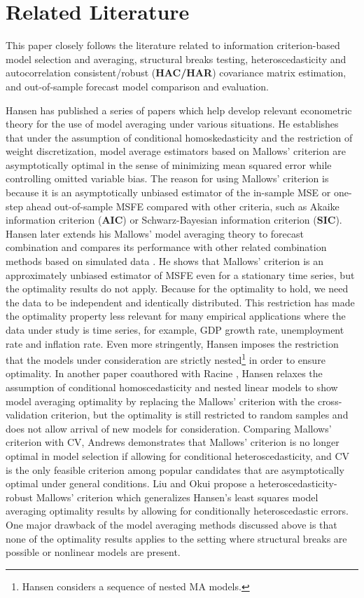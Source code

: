 \section{Related Literature}
This paper closely follows the literature related to information criterion-based model selection and averaging, structural breaks testing, heteroscedasticity and autocorrelation consistent/robust (\textbf{HAC/HAR}) covariance matrix estimation, and out-of-sample forecast model comparison and evaluation.

Hansen has published a series of papers \cite{hansen_EMETRICA2007} \cite{hansen_JE2008} \cite{hansen2009averaging} \cite{hansen2011jackknife} which help develop relevant econometric theory for the use of model averaging under various situations. He establishes that under the assumption of conditional homoskedasticity and the restriction of weight discretization, model average estimators based on Mallows' criterion are asymptotically optimal in the sense of minimizing mean squared error while controlling omitted variable bias. The reason for using Mallows' criterion is because it is an asymptotically unbiased estimator of the in-sample MSE or one-step ahead out-of-sample MSFE compared with other criteria, such as Akaike information criterion (\textbf{AIC}) or Schwarz-Bayesian information criterion (\textbf{SIC}). Hansen later extends his Mallows' model averaging theory to forecast combination and compares its performance with other related combination methods based on simulated data \cite{hansen_JE2008}. He shows that Mallows' criterion is an approximately unbiased estimator of MSFE even for a stationary time series, but the optimality results do not apply. Because for the optimality to hold, we need the data to be independent and identically distributed. This restriction has made the optimality property less relevant for many empirical applications where the data under study is time series, for example, GDP growth rate, unemployment rate and inflation rate. Even more stringently, Hansen imposes the restriction that the models under consideration are strictly nested\footnote{Hansen considers a sequence of nested MA models.} in order to ensure optimality. In another paper coauthored with Racine \cite{hansen2011jackknife}, Hansen relaxes the assumption of conditional homoscedasticity and nested linear models to show model averaging optimality by replacing the Mallows' criterion with the cross-validation criterion, but the optimality is still restricted to random samples and does not allow arrival of new models for consideration. Comparing Mallows' criterion with CV, Andrews \cite{andrews_JE1991} demonstrates that Mallows' criterion is no longer optimal in model selection if allowing for conditional heteroscedasticity, and CV is the only feasible criterion among popular candidates that are asymptotically optimal under general conditions. Liu and Okui \cite{liu_okui2012} propose a heteroscedasticity-robust Mallows' criterion which generalizes Hansen's least squares model averaging optimality results by allowing for conditionally heteroscedastic errors. One major drawback of the model averaging methods discussed above is that none of the optimality results applies to the setting where structural breaks are possible or nonlinear models are present.

